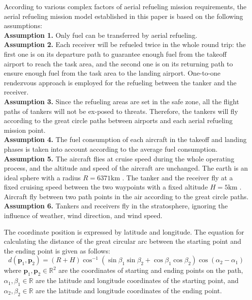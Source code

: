 According to various complex factors of aerial refueling mission requirements, the aerial refueling mission model established in this paper is based on the following assumptions:\\
\textbf{Assumption 1.} Only fuel can be transferred by aerial refueling.\\
\textbf{Assumption 2.}  Each receiver will be refueled twice in the whole round trip: the first one is on its departure path to guarantee enough fuel from the takeoff airport to reach the task area, and the second one is on its returning path to ensure enough fuel from the task area to the landing airport. One-to-one rendezvous approach is employed for the refueling between the tanker and the receiver.\\\textbf{Assumption 3.}  Since the refueling areas are set in the safe zone, all the flight paths of tankers will not be ex-posed to threats. Therefore, the tankers will fly according to the great circle paths between airports and each aerial refueling mission point.\\
\textbf{Assumption 4.}  The fuel consumption of each aircraft in the takeoff and landing phases is taken into account according to the average fuel consumption.\\
\textbf{Assumption 5.}  The aircraft flies at cruise speed during the whole operating process, and the altitude and speed of the aircraft are unchanged. The earth is an ideal sphere with a radius $R=6371 \text{km}$ . The tanker and the receiver fly at a fixed cruising speed between the two waypoints with a fixed altitude $H=5 \text{km}$ . Aircraft fly between two path points in the air according to the great circle paths. \\
\textbf{Assumption 6.}  Tankers and receivers fly in the stratosphere, ignoring the influence of weather, wind direction, and wind speed.

The coordinate position is expressed by latitude and longitude. The equation for calculating the distance of the great circular arc between the starting point and the ending point is given as follows:
\begin{equation}
\left.d\left(\mathbf{p}_{1},\mathbf{p}_{2}\right.\right)=\left(R+H\right)\cos^{-1}\left(\sin\beta_{1}\sin\beta_{2}+\cos\beta_{1}\cos\beta_{2}\right)\cos\left(\alpha_{2}-\alpha_{1}\right)
\label{eq:15.1}
\end{equation}
where $\mathbf{p}_{1},\mathbf{\textbf{p}}_{2}\in\mathbb{R}^{2}$ are the coordinates of starting and ending points on the path, $\alpha_{1},\beta_{1}\in\mathbb{R}$ are the latitude and longitude coordinates of the starting point, and $\alpha_{2},\beta_{2}\in\mathbb{R}$ are the latitude and longitude coordinates of the ending point.

